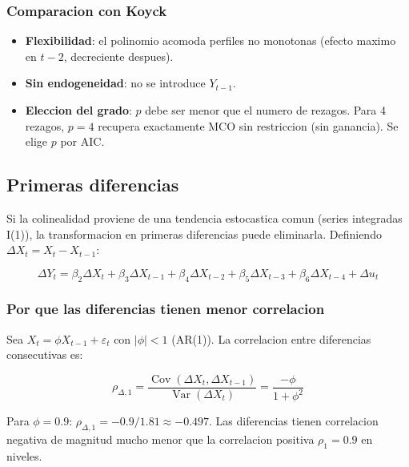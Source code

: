 \documentclass[12pt, letterpaper]{article}
\theoremstyle{remark}
\newcommand{\Var}{\operatorname{Var}}
\newcommand{\Cov}{\operatorname{Cov}}
\begin{document}
\subsubsection{Comparacion con Koyck}

\begin{itemize}[leftmargin=1.6em, itemsep=3pt]
  \item \textbf{Flexibilidad}: el polinomio acomoda perfiles no monotonas
    (efecto maximo en $t-2$, decreciente despues).
  \item \textbf{Sin endogeneidad}: no se introduce $Y_{t-1}$.
  \item \textbf{Eleccion del grado}: $p$ debe ser menor que el numero de
    rezagos. Para 4 rezagos, $p=4$ recupera exactamente MCO sin restriccion
    (sin ganancia). Se elige $p$ por AIC.
\end{itemize}

\subsection{Primeras diferencias}

Si la colinealidad proviene de una tendencia estocastica comun (series
integradas I(1)), la transformacion en primeras diferencias puede eliminarla.
Definiendo $\Delta X_t = X_t - X_{t-1}$:

\begin{equation}
  \Delta Y_t = \beta_2 \Delta X_t + \beta_3 \Delta X_{t-1}
               + \beta_4 \Delta X_{t-2} + \beta_5 \Delta X_{t-3}
               + \beta_6 \Delta X_{t-4} + \Delta u_t
  \label{eq:diferencias}
\end{equation}

\subsubsection{Por que las diferencias tienen menor correlacion}

Sea $X_t = \phi X_{t-1} + \varepsilon_t$ con $|\phi| < 1$ (AR(1)). La
correlacion entre diferencias consecutivas es:

\begin{equation}
  \rho_{\Delta,1}
    = \frac{\Cov(\Delta X_t, \Delta X_{t-1})}{\Var(\Delta X_t)}
    = \frac{-\phi}{1 + \phi^2}
  \label{eq:corr_diff}
\end{equation}

Para $\phi = 0.9$: $\rho_{\Delta,1} = -0.9/1.81 \approx -0.497$. Las
diferencias tienen correlacion negativa de magnitud mucho menor que la
correlacion positiva $\rho_1 = 0.9$ en niveles.
\end{document}
